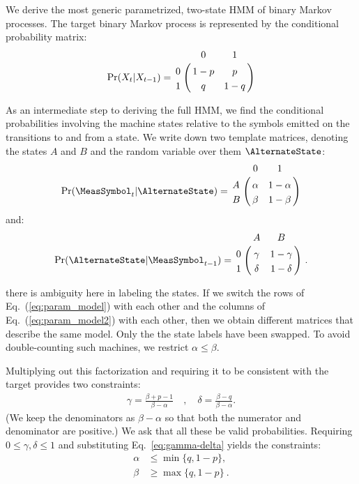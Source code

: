 \documentclass[final,nofootinbib,aps,pre,twocolumn,showpacs,groupaddress,preprintnumbers,floatfix]{revtex4-1}
\begin{document}
We derive the most generic parametrized, two-state HMM of binary Markov
processes. The target binary Markov process is represented by the conditional
probability matrix:
\begin{align}
  \Pr(X_t | X_{t-1}) = \bordermatrix {
    ~ & 0     & 1     \cr
    0 & 1 - p & p     \cr
    1 & q     & 1 - q
  }
\label{eq:binary_chain_trans_matr}
\end{align}

As an intermediate step to deriving the full HMM, we find
the conditional probabilities involving the machine states relative
to the symbols emitted on the transitions to and from a state. We
write down two template matrices, denoting the states $A$ and $B$
and the random variable over them $\AlternateState$:
\begin{align}
  \Pr(\MeasSymbol_{t} | \AlternateState)= \bordermatrix{
    ~ & 0      & 1          \cr
    A & \alpha & 1 - \alpha \cr
    B & \beta  & 1 - \beta
  }
\label{eq:param_model}
\end{align}
and:
\begin{align}
  \Pr(\AlternateState | \MeasSymbol_{t-1}) = \bordermatrix {
    ~ & A      & B          \cr
    0 & \gamma & 1 - \gamma \cr
    1 & \delta & 1 - \delta
  }
  ~.
\label{eq:param_model2}
\end{align}

there is ambiguity here in labeling the states. If we switch the rows of
Eq.~(\ref{eq:param_model}) with each other and the columns of
Eq.~(\ref{eq:param_model2}) with each other, then we obtain different matrices
that describe the same model. Only the the state labels have been swapped. To
avoid double-counting such machines, we restrict $\alpha \leq \beta$.

Multiplying out this factorization and requiring it to be consistent
with the target provides two constraints:
\begin{align}
  \gamma = \frac{\beta + p - 1}{\beta-\alpha} \quad, \quad
  \delta = \frac{\beta-q}{\beta-\alpha}.
  \label{eq:gamma-delta}
\end{align}
(We keep the denominators as $\beta-\alpha$ so that both the numerator and
denominator are positive.) We ask that all these be valid probabilities.
Requiring $0\leq \gamma,\delta\leq 1$ and substituting
Eq.~\eqref{eq:gamma-delta} yields the constraints:
\begin{align*}
\alpha & \leq \min\{q,1-p\},\\
  \beta & \geq \max\{q,1-p\}
  ~.
\end{align*}
\end{document}
